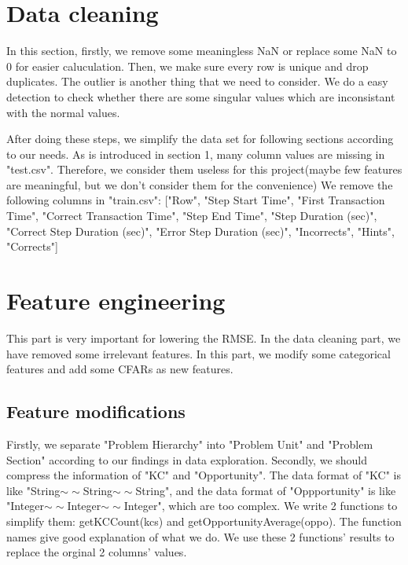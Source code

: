 \documentclass{article}
\begin{document}
\section{Data cleaning}
In this section, firstly, we remove some meaningless NaN or replace some NaN to 0 for easier caluculation. Then, we make sure every row is unique and drop duplicates. The outlier is another thing that we need to consider.
We do a easy detection to check whether there are some singular values which are inconsistant with the normal values.

After doing these steps, we simplify the data set for following sections according to our needs. As is introduced in section 1, many column values are missing in "test.csv". Therefore, we consider them useless for this project(maybe few features are meaningful, but we don't consider them for the convenience) 
We remove the following columns in "train.csv": ["Row", "Step Start Time", "First Transaction Time", 
"Correct Transaction Time", "Step End Time", "Step Duration (sec)", 
"Correct Step Duration (sec)", "Error Step Duration (sec)", 
"Incorrects", "Hints", "Corrects"]
\section{Feature engineering}
This part is very important for lowering the RMSE. In the data cleaning part, we have removed some irrelevant features. In this part, we modify some categorical features and add some CFARs as new features.
\subsection{Feature modifications}
Firstly, we separate "Problem Hierarchy" into "Problem Unit" and "Problem Section" according to our findings in data exploration. 
Secondly, we should compress the information of "KC" and "Opportunity". The data format of "KC" is like "String$\sim\sim$String$\sim\sim$String", and the data format of "Oppportunity" is like "Integer$\sim\sim$Integer$\sim\sim$Integer", 
which are too complex. We write 2 functions to simplify them: getKCCount(kcs) and getOpportunityAverage(oppo). The function names give good explanation of what we do. 
We use these 2 functions' results to replace the orginal 2 columns' values.
\end{document}
